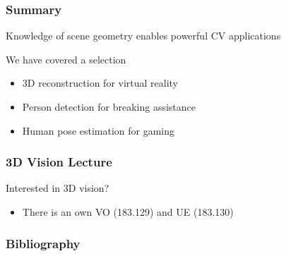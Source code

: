\documentclass[xetex,professionalfont]{beamer}
\begin{document}

\begin{frame}
\frametitle{Summary}

Knowledge of scene geometry enables powerful CV applications

\bigskip
We have covered a selection
\begin{itemize}
    \item 3D reconstruction for virtual reality
    \item Person detection for breaking assistance
    \item Human pose estimation for gaming
\end{itemize}

\end{frame}


\begin{frame}
\frametitle{3D Vision Lecture}

Interested in 3D vision?
\begin{itemize}
    \item There is an own VO (183.129) and UE (183.130)
\end{itemize}

\end{frame}


\begin{frame}[allowframebreaks=0.8]
\frametitle{Bibliography}

\printbibliography

\end{frame}
\end{document}
